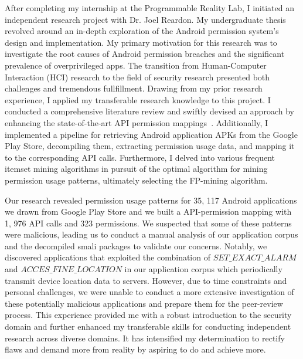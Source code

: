 \documentclass{article}
\begin{document}
After completing my internship at the Programmable Reality Lab, I initiated an independent research project with Dr. Joel Reardon.
My undergraduate thesis revolved around an in-depth exploration of the Android permission system's design and implementation. 
My primary motivation for this research was to investigate the root causes of Android permission breaches 
and the significant prevalence of overprivileged apps.
The transition from Human-Computer Interaction (HCI) research to the field of security research presented both challenges and 
tremendous fullfillment. Drawing from my prior research experience, I applied my transferable research knowledge to this project. 
I conducted a comprehensive literature review and swiftly devised an approach by enhancing the state-of-the-art API 
permission mappings~\cite{felt2011android,au2012pscout}. Additionally, I implemented a pipeline for retrieving Android application APKs from the Google Play Store, 
decompiling them, extracting permission usage data, and mapping it to the corresponding API calls. 
Furthermore, I delved into various frequent itemset mining algorithms in pursuit of the optimal algorithm for 
mining permission usage patterns, ultimately selecting the FP-mining algorithm.

Our research revealed permission usage patterns for 35, 117 Android
applications we drawn from Google Play Store and we built a 
API-permission mapping with 1, 976 API calls and 323 permissions. We suspected that some of these patterns were malicious, 
leading us to conduct a manual analysis of our application corpus and the decompiled smali packages to
validate our concerns. Notably, we discovered applications that exploited the combination of \textit{$SET\_EXACT\_ALARM$} and 
\textit{$ACCES\_FINE\_LOCATION$} in our application corpus which periodically transmit device location data to servers. 
However, due to time constraints and personal challenges, we were unable to conduct a 
more extensive investigation of these potentially malicious applications and prepare them for the peer-review process.
This experience provided me with a robust introduction to the security domain and further enhanced my transferable skills 
for conducting independent research across diverse domains. It has intensified my determination to rectify
flaws and demand more from reality by aspiring to do and achieve more.
\end{document}
